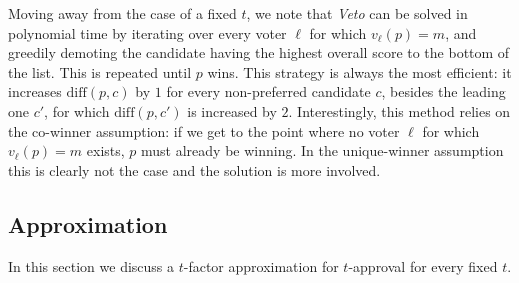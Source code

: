 \documentclass[letterpaper]{article} %
\newcommand{\CMCF}{\emph{minimal cost flow}}
\newcommand{\diff}{\mathrm{diff}}
\begin{document}
Moving away from the case of a fixed $t$, we note that \emph{Veto} can be solved in polynomial time by iterating over every voter $\ell$ for which $v_\ell(p)=m$, and greedily demoting the candidate having the highest overall score to the bottom of the list. This is repeated until $p$ wins. This strategy is always the most efficient: it increases $\diff(p,c)$ by $1$ for every non-preferred candidate $c$, besides the leading one $c'$, for which $\diff(p,c')$ is increased by $2$.
Interestingly, this method relies on the co-winner assumption: if we get to the point where no voter  $\ell$ for which $v_\ell(p)=m$ exists, $p$ must already be winning. In the unique-winner assumption this is clearly not the case and the solution is more involved.

\subsection{Approximation}
In this section we discuss a $t$-factor approximation for $t$-approval for every fixed $t$.
\end{document}
